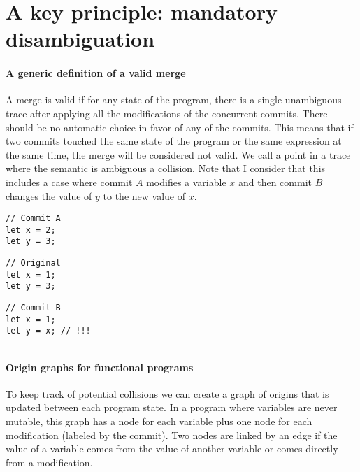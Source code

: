 \documentclass[a4paper,10pt]{article}
\begin{document}
\section{A key principle: mandatory disambiguation}
\paragraph{A generic definition of a valid merge} A merge is valid if for any state of the program, there is a single unambiguous trace after applying all the modifications of the concurrent commits. There should be no automatic choice in favor of any of the commits. This means that if two commits touched the same state of the program or the same expression at the same time, the merge will be considered not valid. We call a point in a trace where the semantic is ambiguous a collision.
Note that I consider that this includes a case where commit $A$ modifies a variable $x$ and then commit $B$ changes the value of $y$ to the new value of $x$.

\noindent
\begin{minipage}{.32\textwidth}
\begin{lstlisting}
// Commit A
let x = 2;
let y = 3;
\end{lstlisting}
\end{minipage}\hfill
\begin{minipage}{.32\textwidth}
\begin{lstlisting}
// Original
let x = 1;
let y = 3;
\end{lstlisting}
\end{minipage}\hfill
\begin{minipage}{.32\textwidth}
\begin{lstlisting}
// Commit B
let x = 1;
let y = x; // !!!
\end{lstlisting}
\end{minipage}
\vspace{-.4cm}
\begin{lstlisting}[label=lst:change_introducing_modified, caption={Colliding changes by using a variable modified by someone else}]
\end{lstlisting}

\paragraph{Origin graphs for functional programs} To keep track of potential collisions we can create a graph of origins that is updated between each program state. In a program where variables are never mutable, this graph has a node for each variable plus one node for each modification (labeled by the commit). Two nodes are linked by an edge if the value of a variable comes from the value of another variable or comes directly from a modification.
\end{document}
